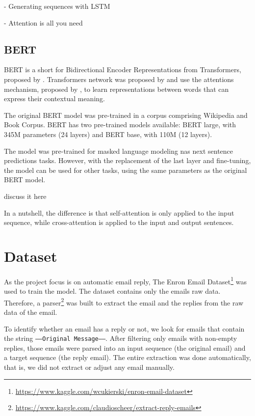 \documentclass[letterpaper]{article}
\begin{document}
\cite{DBLP:journals/corr/Graves13} - Generating sequences with LSTM

- Attention is all you need


\subsection{BERT}

BERT is a short for Bidirectional Encoder Representations from Transformers, proposed by \cite{DBLP:journals/corr/abs-1810-04805}. Transformers network was proposed by \cite{DBLP:journals/corr/VaswaniSPUJGKP17} and use the attentions mechanism, proposed by \cite{DBLP:journals/corr/BahdanauCB14}, to learn representations between words that can express their contextual meaning.

The original BERT model was pre-trained in a corpus comprising Wikipedia and Book Corpus. BERT has two pre-trained models available: BERT large, with \num{345}{M} parameters (24 layers) and BERT base, with \num{110}{M} (12 layers).

The model was pre-trained for masked language modeling nas next sentence predictions tasks. However, with the replacement of the last layer and fine-tuning, the model can be used for other tasks, using the same parameters as the original BERT model.


discuss it here

In a nutshell, the difference is that self-attention is only applied to the input sequence, while cross-attention is applied to the input and output sentences.


\section{Dataset}

As the project focus is on automatic email reply, The Enron Email Dataset\footnote{\href{https://www.kaggle.com/wcukierski/enron-email-dataset}{https://www.kaggle.com/wcukierski/enron-email-dataset}} was used to train the model. The dataset contains only the emails raw data. Therefore, a parser\footnote{\href{https://www.kaggle.com/claudioscheer/extract-reply-emails}{https://www.kaggle.com/claudioscheer/extract-reply-emails}} was built to extract the email and the replies from the raw data of the email.

To identify whether an email has a reply or not, we look for emails that contain the string \texttt{-----Original Message-----}. After filtering only emails with non-empty replies, those emails were parsed into an input sequence (the original email) and a target sequence (the reply email). The entire extraction was done automatically, that is, we did not extract or adjust any email manually.
\end{document}
